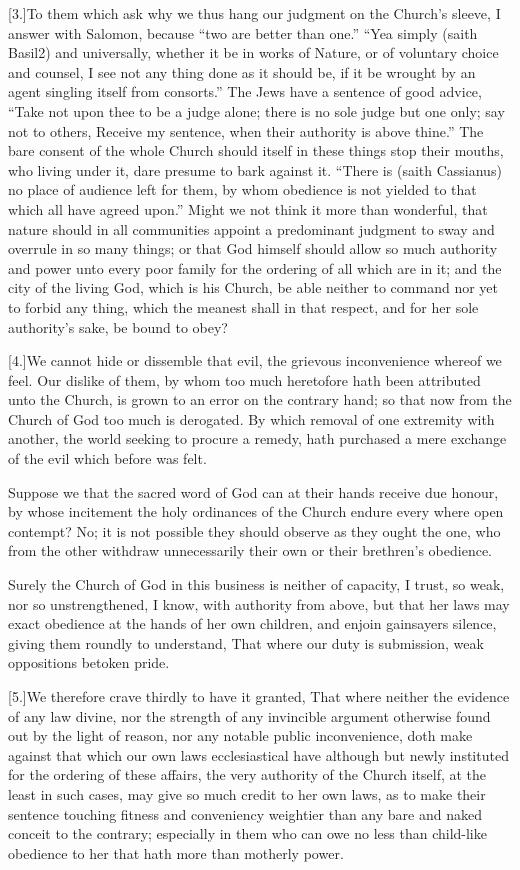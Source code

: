 [3.]To them which ask why we thus hang our judgment on the Church’s sleeve, I answer with Salomon, because “two are better than one.” “Yea simply (saith Basil2) and universally, whether it be in works of Nature, or of voluntary choice and counsel, I see not any thing done as it should be, if it be wrought by an agent singling itself from consorts.” The Jews have a sentence of good advice, “Take not upon thee to be a judge alone; there is no sole judge but one only; say not to others, Receive my sentence, when their authority is above thine.” The bare consent of the whole Church should itself in these things stop their mouths,  who living under it, dare presume to bark against it.
 “There is (saith Cassianus) no place of audience left for them, by whom obedience is not yielded to that which all have agreed upon.” Might we not think it more than wonderful, that nature should in all communities appoint a predominant judgment to sway and overrule in so many things; or that God himself should allow so much authority and power unto every poor family for the ordering of all which are in it; and the city of the living God, which is his Church, be able neither to command nor yet to forbid any thing, which the meanest shall in that respect, and for her sole authority’s sake, be bound to obey?

[4.]We cannot hide or dissemble that evil, the grievous inconvenience whereof we feel. Our dislike of them, by whom too much heretofore hath been attributed unto the Church, is grown to an error on the contrary hand; so that now from the Church of God too much is derogated. By which removal of one extremity with another, the world seeking to procure a remedy, hath purchased a mere exchange of the evil which before was felt.

Suppose we that the sacred word of God can at their hands receive due honour, by whose incitement the holy ordinances of the Church endure every where open contempt? No; it is not possible they should observe as they ought the one, who from the other withdraw unnecessarily their own or their brethren’s obedience.

Surely the Church of God in this business is neither of capacity, I trust, so weak, nor so unstrengthened, I know, with authority from above, but that her laws may exact obedience at the hands of her own children, and enjoin gainsayers silence, giving them roundly to understand, That where our duty is submission, weak oppositions betoken pride.

[5.]We therefore crave thirdly to have it granted, That where neither the evidence of any law divine, nor the strength of any invincible argument otherwise found out by the light of reason, nor any notable public inconvenience, doth make  against that which our own laws ecclesiastical have although but newly instituted for the ordering of these affairs,
 the very authority of the Church itself, at the least in such cases, may give so much credit to her own laws, as to make their sentence touching fitness and conveniency weightier than any bare and naked conceit to the contrary; especially in them who can owe no less than child-like obedience to her that hath more than motherly power.


